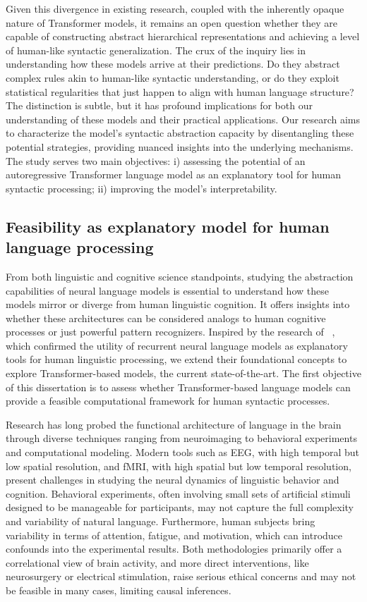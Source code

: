 Given this divergence in existing research, coupled with the inherently opaque nature of Transformer models, it remains an open question whether they are capable of constructing abstract hierarchical representations and achieving a level of human-like syntactic generalization. The crux of the inquiry lies in understanding how these models arrive at their predictions. Do they abstract complex rules akin to human-like syntactic understanding, or do they exploit statistical regularities that just happen to align with human language structure? The distinction is subtle, but it has profound implications for both our understanding of these models and their practical applications. Our research aims to characterize the model's syntactic abstraction capacity by disentangling these potential strategies, providing nuanced insights into the underlying mechanisms. The study serves two main objectives: i) assessing the potential of an autoregressive Transformer language model as an explanatory tool for human syntactic processing; ii) improving the model's interpretability.


\subsection{Feasibility as explanatory model for human language processing} 
From both linguistic and cognitive science standpoints, studying the abstraction capabilities of neural language models is essential to understand how these models mirror or diverge from human linguistic cognition. It offers insights into whether these architectures can be considered analogs to human cognitive processes or just powerful pattern recognizers. Inspired by the research of ~\cite{hupkes2020hierarchy}, which confirmed the utility of recurrent neural language models as explanatory tools for human linguistic processing, we extend their foundational concepts to explore Transformer-based models, the current state-of-the-art. 
The first objective of this dissertation is to assess whether Transformer-based language models can provide a feasible computational framework for
human syntactic processes.

Research has long probed the functional architecture of language in the brain through diverse techniques ranging from neuroimaging to behavioral experiments and computational modeling. Modern tools such as EEG, with high temporal but low spatial resolution, and fMRI, with high spatial but low temporal resolution, present challenges in studying the neural dynamics of linguistic behavior and cognition. Behavioral experiments, often involving small sets of artificial stimuli designed to be manageable for participants, may not capture the full complexity and variability of natural language. Furthermore, human subjects bring variability in terms of attention, fatigue, and motivation, which can introduce confounds into the experimental results. Both methodologies primarily offer a correlational view of brain activity, and more direct interventions, like neurosurgery or electrical stimulation, raise serious ethical concerns and may not be feasible in many cases, limiting causal inferences.

